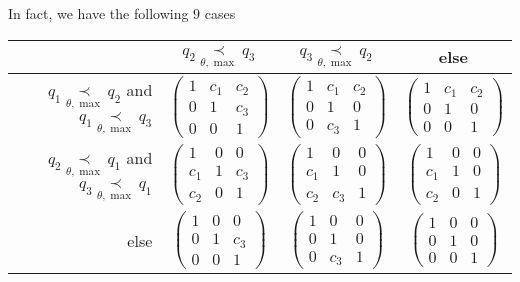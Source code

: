 In fact, we have the following $9$ cases
\begin{center}
  \def\arraystretch{1.3}
  \setlength\tabcolsep{4mm}
  \begin{tabular}{r|c|c|c}
    & $q_2 \underset{\theta,\max}{\prec} q_3$
    & $q_3 \underset{\theta,\max}{\prec} q_2$
    & else
    \tabularnewline
    \hline
    $q_1 \underset{\theta,\max}{\prec} q_2$ and
    $q_1 \underset{\theta,\max}{\prec} q_3$
    & $\begin{pmatrix} 1 & c_1 & c_2 \\0 & 1 & c_3 \\0 & 0 & 1 \end{pmatrix}$
   \cellcolor{blue!15}
    & $\begin{pmatrix} 1 & c_1 & c_2 \\0 & 1 & 0 \\0 & c_3 & 1 \end{pmatrix}$
   \cellcolor{blue!15}
    & $\begin{pmatrix} 1 & c_1 & c_2 \\0 & 1 & 0 \\0 & 0 & 1 \end{pmatrix}$
   \cellcolor{green!15}
    \tabularnewline
    \hline
    $q_2 \underset{\theta,\max}{\prec} q_1$ and
    $q_3 \underset{\theta,\max}{\prec} q_1$
    & $\begin{pmatrix} 1 & 0 & 0 \\c_1 & 1 & c_3 \\c_2 & 0 & 1 \end{pmatrix}$
   \cellcolor{blue!15}
    & $\begin{pmatrix} 1 & 0 & 0 \\c_1 & 1 & 0 \\c_2 & c_3 & 1 \end{pmatrix}$
   \cellcolor{blue!15}
    & $\begin{pmatrix} 1 & 0 & 0 \\c_1 & 1 & 0 \\c_2 & 0 & 1 \end{pmatrix}$
   \cellcolor{green!15}
    \tabularnewline
    \hline
    else
    & $\begin{pmatrix} 1 & 0 & 0 \\0 & 1 & c_3 \\0 & 0 & 1 \end{pmatrix}$
   \cellcolor{purple!15}
    & $\begin{pmatrix} 1 & 0 & 0 \\0 & 1 & 0 \\0 & c_3 & 1 \end{pmatrix}$
   \cellcolor{purple!15}
    & $\begin{pmatrix} 1 & 0 & 0 \\0 & 1 & 0 \\0 & 0 & 1 \end{pmatrix}$
  \end{tabular}
\end{center}
